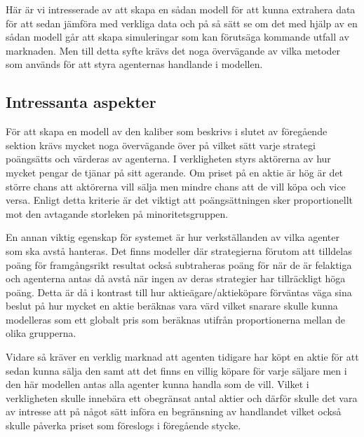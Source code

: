
Här är vi intresserade av att skapa en sådan modell för att kunna extrahera data för att sedan jämföra med verkliga data och på så sätt se om det med hjälp av en sådan modell går att skapa simuleringar som kan förutsäga kommande utfall av marknaden. Men till detta syfte krävs det noga övervägande av vilka metoder som används för att styra agenternas handlande i modellen. %
\subsection{Intressanta aspekter}

För att skapa en modell av den kaliber som beskrivs i slutet av föregående sektion krävs mycket noga övervägande över på vilket sätt varje strategi poängsätts och värderas av agenterna. I verkligheten styrs aktörerna av hur mycket pengar de tjänar på sitt agerande. Om priset på en aktie är hög är det större chans att aktörerna vill sälja men mindre chans att de vill köpa och vice versa. Enligt detta kriterie är det viktigt att poängsättningen sker proportionellt mot den avtagande storleken på minoritetsgruppen. 

En annan viktig egenskap för systemet är hur verkställanden av vilka agenter som ska avstå hanteras. Det finns modeller där strategierna förutom att tilldelas poäng för framgångsrikt resultat också subtraheras poäng för när de är felaktiga och agenterna antas då avstå när ingen av deras strategier har tillräckligt höga poäng. Detta är då i kontrast till hur aktieägare/aktieköpare förväntas väga sina beslut på hur mycket en aktie beräknas vara värd vilket snarare skulle kunna modelleras som ett globalt pris som beräknas utifrån proportionerna mellan de olika grupperna.

Vidare så kräver en verklig marknad att agenten tidigare har köpt en aktie för att sedan kunna sälja den samt att det finns en villig köpare för varje säljare men i den här modellen antas alla agenter kunna handla som de vill. Vilket i verkligheten skulle innebära ett obegränsat antal aktier och därför skulle det vara av intresse att på något sätt införa en begränsning av handlandet vilket också skulle påverka priset som föreslogs i föregående stycke. 

